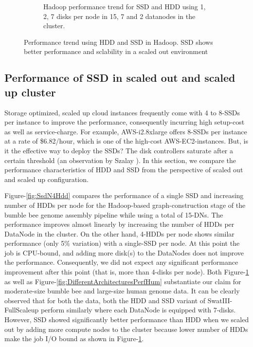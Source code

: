 \documentclass[conference]{IEEEtran}
\begin{document}
\begin{figure}[h]
\begin{subfigure}[b]{0.23\textwidth}
          \caption{Hadoop performance trend for SSD and HDD using 1, 2, 7 disks per node in 15, 7 and 2 datanodes in the cluster.}
          \label{fig:SsdNHddDiffNodes}
  \end{subfigure}
  \caption{Performance trend using HDD and SSD in Hadoop. SSD shows better performance and sclability in a scaled out environment}
  \label{fig:SsdNHdd}
  \vspace{-.8em}
\end{figure}
\subsection {Performance of SSD in scaled out and scaled up cluster} \label{ScaledupClusterAndSSD}
Storage optimized, scaled up cloud instances frequently come with 4 to 8-SSDs per instance to improve the performance, consequently incurring high setup-cost as well as service-charge. For example, AWS-i2.8xlarge offers 8-SSDs per instance at a rate of \$6.82/hour, which is one of the high-cost AWS-EC2-instances. But, is it the effective way to deploy the SSDs? The disk controllers saturate after a certain threshold (an observation by Szalay \cite{cluster:AmdahlBalancedBlade}). In this section, we compare the performance characteristics of HDD and SSD from the perspective of scaled out and scaled up configuration.

Figure-\ref{fig:SsdN4Hdd} compares the performance of a single SSD and increasing number of HDDs per node for the Hadoop-based graph-construction stage of the bumble bee genome assembly pipeline while using a total of 15-DNs. The performance improves almost linearly by increasing the number of HDDs per DataNode in the cluster. On the other hand, 4-HDDs per node shows similar performance (only 5\% variation) with a single-SSD per node.
At this point the job is CPU-bound, and adding more disk(s) to the DataNodes does not improve the performance. Consequently, we did not expect any significant performance improvement after this point (that is, more than 4-disks per node). Both Figure-\ref{fig:SsdNHddDiffNodes} as well as Figure-\ref{fig:DifferentArchitecturesPerfHum} substantiate our claim for moderate-size bumble bee and large-size human genome data. It can be clearly observed that for both the data, both the HDD and SSD variant of SwatIII-FullScaleup perform similarly where each DataNode is equipped with 7-disks. However, SSD showed significantly better performance than HDD when we scaled out by adding more compute nodes to the cluster because lower number of HDDs make the job I/O bound as shown in Figure-\ref{fig:SsdNHddDiffNodes}.
\end{document}

